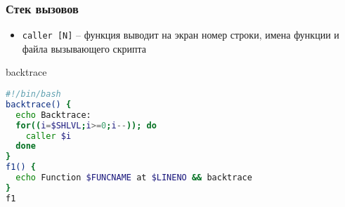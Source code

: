 \begin{frame}[fragile]
	\frametitle{Стек вызовов}

	\begin{itemize}
		\item {\tt caller [N]} -- функция выводит на экран номер строки, имена функции и файла вызывающего скрипта
	\end{itemize}

	\begin{block}{backtrace}
		\begin{lstlisting}[language=sh]
#!/bin/bash
backtrace() {
  echo Backtrace:
  for((i=$SHLVL;i>=0;i--)); do
    caller $i
  done
}
f1() {
  echo Function $FUNCNAME at $LINENO && backtrace
}
f1
		\end{lstlisting}
	\end{block}

\end{frame}
